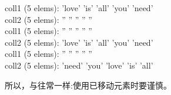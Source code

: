 \begin{tcolorbox}[colback=white,colframe=black]
	coll1 (5 elems): 'love' 'is' 'all' 'you' 'need' \\
	coll2 (5 elems): '' '' '' '' '' \\
	coll1 (5 elems): '' '' '' '' '' \\
	coll2 (5 elems): 'love' 'is' 'all' 'you' 'need' \\
	coll1 (5 elems): '' '' '' '' '' \\
	coll2 (5 elems): 'need' 'you' 'love' 'is' 'all'
\end{tcolorbox}


所以，与往常一样:使用已移动元素时要谨慎。\par
































